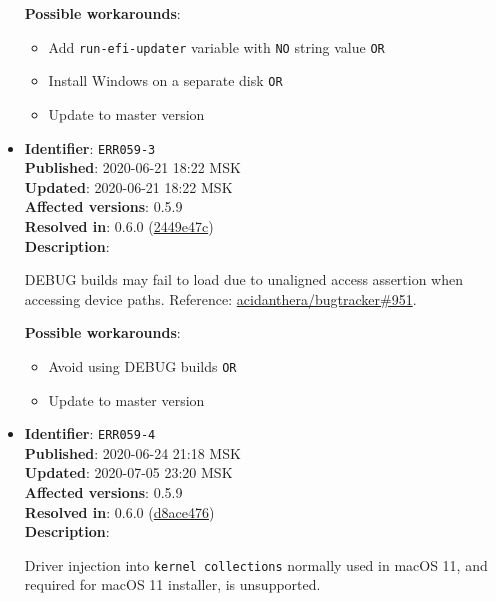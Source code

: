 \documentclass[]{article}
\providecommand{\tightlist}{%
  \setlength{\itemsep}{0pt}\setlength{\parskip}{0pt}}
\begin{document}
\begin{itemize}
  \textbf{Possible workarounds}:
  \begin{itemize}
    \tightlist
    \item Add \texttt{run-efi-updater} variable with \texttt{NO} string value \texttt{OR}
    \item Install Windows on a separate disk \texttt{OR}
    \item Update to master version
  \end{itemize}


\item
  \textbf{Identifier}: \texttt{ERR059-3} \\
  \textbf{Published}: 2020-06-21 18:22 MSK \\
  \textbf{Updated}: 2020-06-21 18:22 MSK \\
  \textbf{Affected versions}: 0.5.9 \\
  \textbf{Resolved in}: 0.6.0 (\href{https://github.com/acidanthera/OpenCorePkg/commit/2449e47cb2d110a288d491beee0b5b168d2bb480}{2449e47c}) \\
  \textbf{Description}:

  DEBUG builds may fail to load due to unaligned access assertion when accessing device paths.
  Reference: \href{https://github.com/acidanthera/bugtracker/issues/951}{acidanthera/bugtracker\#951}.

  \textbf{Possible workarounds}:
  \begin{itemize}
    \tightlist
    \item Avoid using DEBUG builds \texttt{OR}
    \item Update to master version
  \end{itemize}


\item
  \textbf{Identifier}: \texttt{ERR059-4} \\
  \textbf{Published}: 2020-06-24 21:18 MSK \\
  \textbf{Updated}: 2020-07-05 23:20 MSK \\
  \textbf{Affected versions}: 0.5.9 \\
  \textbf{Resolved in}: 0.6.0 (\href{https://github.com/acidanthera/OpenCorePkg/commit/d8ace476067ebb4b5abe17e4cdcd094fa3641689}{d8ace476}) \\
  \textbf{Description}:

  Driver injection into \texttt{kernel collections} normally used in macOS 11,
  and required for macOS 11 installer, is unsupported.


\end{itemize}
\end{document}

